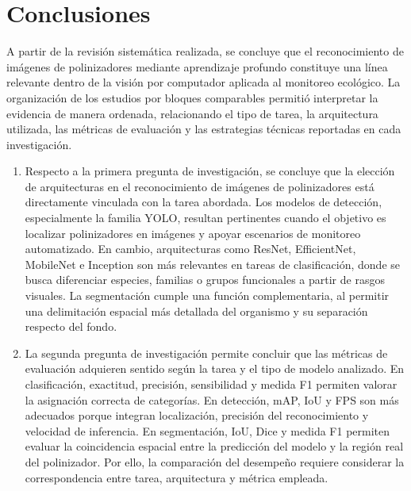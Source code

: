 \chapter{Conclusiones}

A partir de la revisión sistemática realizada, se concluye que el reconocimiento de imágenes de polinizadores mediante aprendizaje profundo constituye una línea relevante dentro de la visión por computador aplicada al monitoreo ecológico. La organización de los estudios por bloques comparables permitió interpretar la evidencia de manera ordenada, relacionando el tipo de tarea, la arquitectura utilizada, las métricas de evaluación y las estrategias técnicas reportadas en cada investigación.

\begin{enumerate}
    \item Respecto a la primera pregunta de investigación, se concluye que la elección de arquitecturas en el reconocimiento de imágenes de polinizadores está directamente vinculada con la tarea abordada. Los modelos de detección, especialmente la familia YOLO, resultan pertinentes cuando el objetivo es localizar polinizadores en imágenes y apoyar escenarios de monitoreo automatizado. En cambio, arquitecturas como ResNet, EfficientNet, MobileNet e Inception son más relevantes en tareas de clasificación, donde se busca diferenciar especies, familias o grupos funcionales a partir de rasgos visuales. La segmentación cumple una función complementaria, al permitir una delimitación espacial más detallada del organismo y su separación respecto del fondo. \\
    
    \item La segunda pregunta de investigación permite concluir que las métricas de evaluación adquieren sentido según la tarea y el tipo de modelo analizado. En clasificación, exactitud, precisión, sensibilidad y medida F1 permiten valorar la asignación correcta de categorías. En detección, mAP, IoU y FPS son más adecuados porque integran localización, precisión del reconocimiento y velocidad de inferencia. En segmentación, IoU, Dice y medida F1 permiten evaluar la coincidencia espacial entre la predicción del modelo y la región real del polinizador. Por ello, la comparación del desempeño requiere considerar la correspondencia entre tarea, arquitectura y métrica empleada. \\
    

\end{enumerate}
